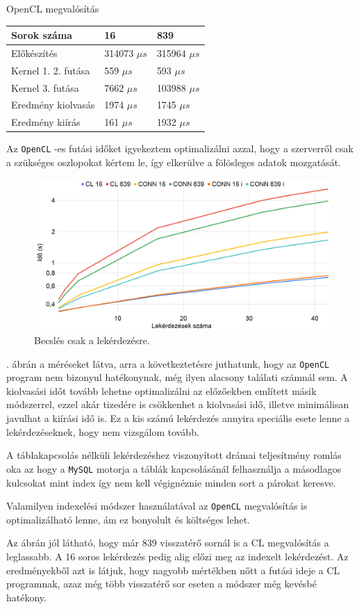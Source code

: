 OpenCL megvalósítás

\begin{table}[h!]
\centering
\begin{tabular}{|p{6cm}|p{3cm}|p{3cm}|}
\hline
Sorok száma & 16 & 839 \\
\hline
\hline
Előkészítés & 314073 $\mu s$ & 315964 $\mu s$ \\
\hline
Kernel 1. 2. futása & 559 $\mu s$ & 593 $\mu s$ \\
\hline
Kernel 3. futása & 7662 $\mu s$ & 103988 $\mu s$ \\
\hline
Eredmény kiolvasás & 1974 $\mu s$ & 1745 $\mu s$ \\
\hline
Eredmény kiírás & 161 $\mu s$ & 1932 $\mu s$ \\
\hline
\end{tabular}
\end{table}	

Az \texttt{OpenCL} -es futási időket igyekeztem optimalizálni azzal, hogy a szerverről csak a szükséges oszlopokat kértem le, így elkerülve a fölösleges adatok mozgatását.

\begin{figure}[h!]
\centering
\includegraphics[width=\textwidth]{images/test/join.png}
\caption{Becslés csak a lekérdezésre.}
\label{fig:join}
\end{figure}

. ábrán a méréseket látva, arra a következtetésre juthatunk, hogy az \texttt{OpenCL} program nem bizonyul hatékonynak, még ilyen alacsony találati számnál sem. A kiolvasási időt tovább lehetne optimalizálni az előzőekben említett másik módszerrel, ezzel akár tizedére is csökkenhet a kiolvasási idő, illetve minimálisan javulhat a kiírási idő is. Ez a kis számú lekérdezés annyira speciális esete lenne a lekérdezéseknek, hogy nem vizsgálom tovább.

A táblakapcsolás nélküli lekérdezéshez viszonyított drámai teljesítmény romlás oka az hogy a \texttt{MySQL} motorja a táblák kapcsolásánál felhasználja a másodlagos kulcsokat mint index így nem kell végignéznie minden sort a párokat keresve.

Valamilyen indexelési módszer használatával az \texttt{OpenCL} megvalósítás is optimalizálható lenne, ám ez bonyolult és költséges lehet.

Az ábrán jól látható, hogy már 839 visszatérő sornál is a CL megvalósítás a leglassabb. A 16 soros lekérdezés pedig alig előzi meg az indexelt lekérdezést.
Az eredményekből azt is látjuk, hogy nagyobb mértékben nőtt a futási ideje a CL programnak, azaz még több visszatérő sor eseten a módszer még kevésbé hatékony.
